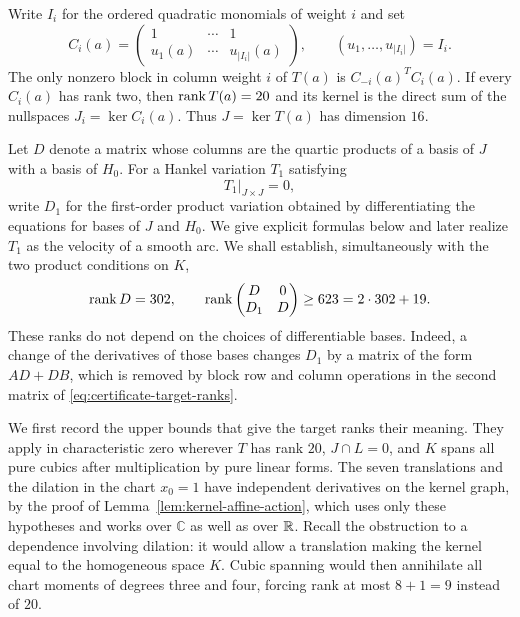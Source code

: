 Write $I_i$ for the ordered quadratic monomials of weight $i$ and set
\[
 C_i(a)=
 \begin{pmatrix}
  1&\cdots&1\\
  u_1(a)&\cdots&u_{|I_i|}(a)
 \end{pmatrix},
 \qquad (u_1,\ldots,u_{|I_i|})=I_i.
\]
The only nonzero block in column weight $i$ of $T(a)$ is
$C_{-i}(a)^TC_i(a)$.  If every $C_i(a)$ has rank two, then
$\operatorname{rank} T(a)=20$ and its kernel is the direct sum of the nullspaces
$J_i=\ker C_i(a)$.  Thus $J=\ker T(a)$ has dimension $16$.

Let $D$ denote a matrix whose columns are the quartic products of a
basis of $J$ with a basis of $H_0$.  For a Hankel variation $T_1$
satisfying
\begin{equation}
 T_1|_{J\times J}=0,
 \label{eq:certificate-tangent}
\end{equation}
write $D_1$ for the first-order product variation obtained by
differentiating the equations for bases of $J$ and $H_0$.  We give
explicit formulas below and later realize $T_1$ as the velocity of
a smooth arc.  We shall establish, simultaneously with the two
product conditions on $K$,
\begin{equation}
 \operatorname{rank} D=302,
 \qquad
 \operatorname{rank}\begin{pmatrix}D&0\\D_1&D\end{pmatrix}\ge623
 =2\cdot302+19.
 \label{eq:certificate-target-ranks}
\end{equation}
These ranks do not depend on the choices of differentiable bases.
Indeed, a change of the derivatives of those bases changes $D_1$ by
a matrix of the form $AD+DB$, which is removed by block row and column
operations in the second matrix of
\eqref{eq:certificate-target-ranks}.

We first record the upper bounds that give the target ranks their
meaning.  They apply in characteristic zero wherever $T$ has rank
$20$, $J\cap L=0$, and $K$ spans all pure cubics after multiplication
by pure linear forms.  The seven translations and the dilation in
the chart $x_0=1$ have independent derivatives on the kernel graph,
by the proof of Lemma~\ref{lem:kernel-affine-action}, which uses
only these hypotheses and works over $\mathbb C$ as well as over
$\mathbb R$.  Recall the obstruction to a dependence involving dilation:
it would allow a translation making the kernel equal to the homogeneous space $K$.
Cubic spanning would then annihilate all chart moments of degrees
three and four, forcing rank at most $8+1=9$ instead of $20$.

